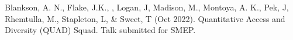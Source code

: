
\item  Blankson, A. N., Flake, J.K., \meb, Logan, J, Madison, M., Montoya, A. K., Pek, J, Rhemtulla, M., Stapleton, L, \& Sweet, T (Oct 2022). Quantitative Access and Diversity (QUAD) Squad. Talk submitted for SMEP.
%
%

%

%

%

%
